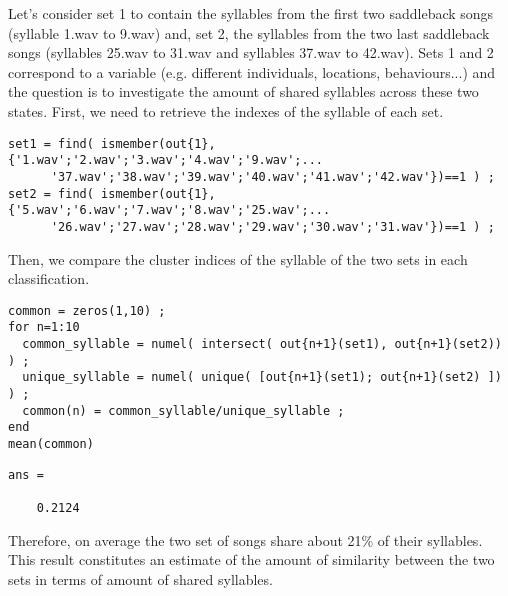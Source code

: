 \documentclass[a4paper]{article}
\begin{document}
Let's consider set 1 to contain the syllables from the first two saddleback songs (syllable 1.wav to 9.wav) and, set 2, the syllables from the two last saddleback songs (syllables 25.wav to 31.wav and syllables 37.wav to 42.wav).
Sets 1 and 2 correspond to a variable (e.g. different individuals, locations, behaviours...) and the question is to investigate the amount of shared syllables across these two states.
First, we need to retrieve the indexes of the syllable of each set.

\begin{verbatim}
set1 = find( ismember(out{1},{'1.wav';'2.wav';'3.wav';'4.wav';'9.wav';...
      '37.wav';'38.wav';'39.wav';'40.wav';'41.wav';'42.wav'})==1 ) ;
set2 = find( ismember(out{1},{'5.wav';'6.wav';'7.wav';'8.wav';'25.wav';...
      '26.wav';'27.wav';'28.wav';'29.wav';'30.wav';'31.wav'})==1 ) ;
\end{verbatim}

Then, we compare the cluster indices of the syllable of the two sets in each classification.

\begin{verbatim}
common = zeros(1,10) ;
for n=1:10
  common_syllable = numel( intersect( out{n+1}(set1), out{n+1}(set2)) ) ;
  unique_syllable = numel( unique( [out{n+1}(set1); out{n+1}(set2) ]) ) ;
  common(n) = common_syllable/unique_syllable ;
end
mean(common)
\end{verbatim}

\color{lightgray}
\begin{verbatim}
ans =

    0.2124
\end{verbatim}
\color{black}

Therefore, on average the two set of songs share about 21\% of their syllables.
This result constitutes an estimate of the amount of similarity between the two sets in terms of amount of shared syllables.



\end{document}
